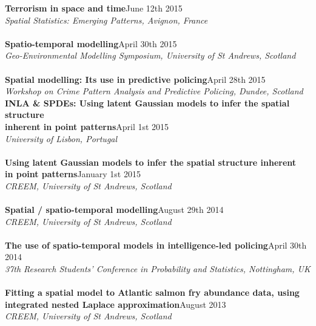 \documentclass[10pt,letter]{article}
\begin{document}
{\textbf{Terrorism in space and time}}\hfill June 12th 2015\\
 {\sl Spatial Statistics: Emerging Patterns, Avignon, France}\\
 \hdashrule[0.5ex]{4cm}{1pt}{1pt}\\
 {\textbf{Spatio-temporal modelling}}\hfill April 30th 2015\\
 {\sl Geo-Environmental Modelling Symposium, University of St Andrews, Scotland}\\
 \hdashrule[0.5ex]{4cm}{1pt}{1pt}\\
{\textbf{Spatial modelling: Its use in predictive policing}}\hfill April 28th 2015\\
{\sl Workshop on Crime Pattern Analysis and Predictive Policing, Dundee, Scotland}\\
\newpage
\noindent
{\textbf{INLA \& SPDEs: Using latent Gaussian models to infer the spatial structure \\
inherent in point patterns}}\hfill April 1st 2015\\
 {\sl University of Lisbon, Portugal}\\
 \hdashrule[0.5ex]{4cm}{1pt}{1pt}\\
 {\textbf{Using latent Gaussian models to infer the spatial
structure inherent \\in point patterns}}\hfill January 1st 2015\\
 {\sl CREEM, University of St Andrews, Scotland}\\
 \hdashrule[0.5ex]{4cm}{1pt}{1pt}\\
 {\textbf{Spatial / spatio-temporal modelling}}\hfill August 29th 2014\\
 {\sl CREEM, University of St Andrews, Scotland}\\
 \hdashrule[0.5ex]{4cm}{1pt}{1pt}\\
{\textbf{The use of spatio-temporal models in intelligence-led policing}}\hfill  April 30th 2014\\
 {\sl 37th Research Students' Conference in Probability and Statistics, Nottingham, UK}\\
 \hdashrule[0.5ex]{4cm}{1pt}{1pt}\\
{\textbf{Fitting a spatial model to Atlantic salmon fry abundance data, using\\ integrated nested Laplace approximation}}\hfill  August 2013\\
 {\sl CREEM, University of St Andrews, Scotland}\\ 
\end{document}
